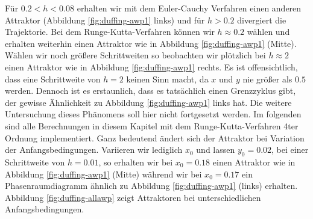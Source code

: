 \documentclass[12pt,a4paper]{article}
\begin{document}
Für $0.2<h<0.08$ erhalten wir mit dem Euler-Cauchy Verfahren einen anderen Attraktor (Abbildung \ref{fig:duffing-awp1} links) und für $h>0.2$ divergiert die Trajektorie. Bei dem Runge-Kutta-Verfahren können wir $h \approx 0.2$ wählen und erhalten weiterhin einen Attraktor wie in Abbildung \ref{fig:duffing-awp1} (Mitte). Wählen wir noch größere Schrittweiten so beobachten wir plötzlich bei $h \approx 2$ einen Attraktor wie in Abbildung \ref{fig:duffing-awp1} rechts. Es ist offensichtlich, dass eine Schrittweite von $h=2$ keinen Sinn macht, da $x$ und $y$ nie größer als $0.5$ werden. Dennoch ist es erstaunlich, dass es tatsächlich einen Grenzzyklus gibt, der gewisse Ähnlichkeit zu Abbildung \ref{fig:duffing-awp1} links hat. Die weitere Untersuchung dieses Phänomens soll hier nicht fortgesetzt werden.
\newline
Im folgenden sind alle Berechnungen in diesem Kapitel mit dem Runge-Kutta-Verfahren 4ter Ordnung implementiert.
Ganz bedeutend ändert sich der Attraktor bei Variation der Anfangsbedingungen. Variieren wir lediglich $x_0$ und lassen $y_0=0.02$, bei einer Schrittweite von $h=0.01$, so erhalten wir bei $x_0=0.18$ einen Attraktor wie in  Abbildung \ref{fig:duffing-awp1} (Mitte) während wir bei $x_0=0.17$ ein Phasenraumdiagramm ähnlich zu Abbildung \ref{fig:duffing-awp1} (links) erhalten.
\newline
Abbildung \ref{fig:duffing-allawp} zeigt Attraktoren bei unterschiedlichen Anfangsbedingungen.
\end{document}
